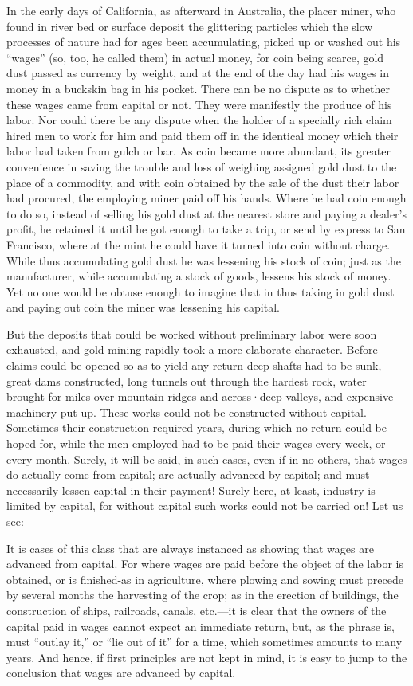 In the early days of California, as afterward in Australia, the placer
miner, who found in river bed or surface deposit the glittering
particles which the slow processes of nature had for ages been
accumulating, picked up or washed out his ``wages'' (so, too, he called
them) in actual money, for coin being scarce, gold dust passed as
currency by weight, and at the end of the day had his wages in money in
a buckskin bag in his pocket. There can be no dispute as to whether
these wages came from capital or not. They were manifestly the produce
of his labor. Nor could there be any dispute when the holder of a
specially rich claim hired men to work for him and paid them off in the
identical money which their labor had taken from gulch or bar. As coin
became more abundant, its greater convenience in saving the trouble and
loss of weighing assigned gold dust to the place of a commodity, and
with coin obtained by the sale of the dust their labor had procured, the
employing miner paid off his hands. Where he had coin enough to do so,
instead of selling his gold dust at the nearest store and paying a
dealer's profit, he retained it until he got enough to take a trip, or
send by express to San Francisco, where at the mint he could have it
turned into coin without charge. While thus accumulating gold dust he
was lessening his stock of coin; just as the manufacturer, while
accumulating a stock of goods, lessens his stock of money. Yet no one
would be obtuse enough to imagine that in thus taking in gold dust and
paying out coin the miner was lessening his capital.

But the deposits that could be worked without preliminary labor were
soon exhausted, and gold mining rapidly took a more elaborate character.
Before claims could be opened so as to yield any return deep shafts had
to be sunk, great dams constructed, long tunnels out through the hardest
rock, water brought for miles over mountain ridges and across·deep
valleys, and expensive machinery put up. These works could not be
constructed without capital. Sometimes their construction required
years, during which no return could be hoped for, while the men employed
had to be paid their wages every week, or every month. Surely, it will
be said, in such cases, even if in no others, that wages do actually
come from capital; are actually advanced by capital; and must
necessarily lessen capital in their payment! Surely here, at least,
industry is limited by capital, for without capital such works could not
be carried on! Let us see:

It is cases of this class that are always instanced as showing that
wages are advanced from capital. For where wages are paid before the
object of the labor is obtained, or is finished-as in agriculture, where
plowing and sowing must precede by several months the harvesting of the
crop; as in the erection of buildings, the construction of ships,
railroads, canals, etc.---it is clear that the owners of the capital
paid in wages cannot expect an immediate return, but, as the phrase is,
must ``outlay it,'' or ``lie out of it'' for a time, which sometimes
amounts to many years. And hence, if first principles are not kept in
mind, it is easy to jump to the conclusion that wages are advanced by
capital.

